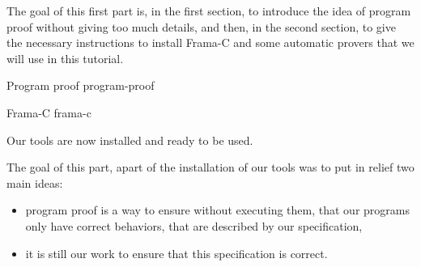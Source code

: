 The goal of this first part is, in the first section, to introduce the
idea of program proof without giving too much details, and then, in the
second section, to give the necessary instructions to install Frama-C
and some automatic provers that we will use in this tutorial.



\begin{levelTwo}
  {Program proof}
  {program-proof}
\end{levelTwo}

\begin{levelTwo}
  {Frama-C}
  {frama-c}
\end{levelTwo}



\horizontalLine
\newpage


Our tools are now installed and ready to be used.



The goal of this part, apart of the installation of our tools was to put
in relief two main ideas:


\begin{itemize}
\item program proof is a way to ensure without executing them, that our programs
  only have correct behaviors, that are described by our specification,
\item it is still our work to ensure that this specification is correct.
\end{itemize}
